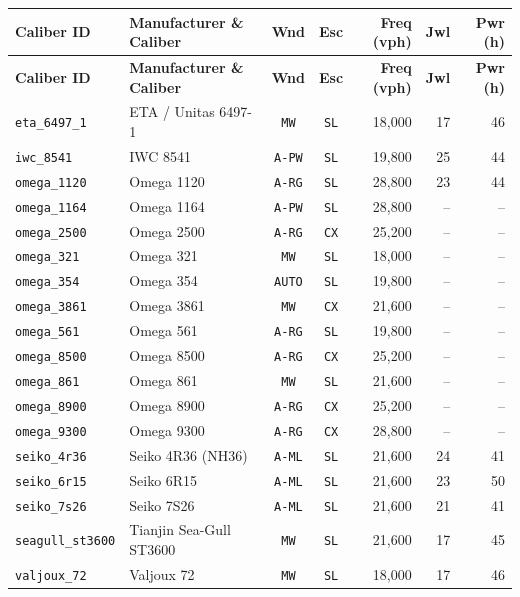 \documentclass[10pt,letterpaper]{article}
\begin{document}
{\small
\setlength{\tabcolsep}{5pt}
\begin{longtable}{@{}l L{4.2cm} c c r r r@{}}
\toprule
\textbf{Caliber ID} & \textbf{Manufacturer \& Caliber} & \textbf{Wnd} & \textbf{Esc} & \textbf{Freq (vph)} & \textbf{Jwl} & \textbf{Pwr (h)} \\
\midrule
\endfirsthead
\toprule
\textbf{Caliber ID} & \textbf{Manufacturer \& Caliber} & \textbf{Wnd} & \textbf{Esc} & \textbf{Freq (vph)} & \textbf{Jwl} & \textbf{Pwr (h)} \\
\midrule
\endhead
\bottomrule
\endfoot
\texttt{eta\_6497\_1} & ETA / Unitas 6497-1 & \texttt{MW} & \texttt{SL} & 18,000 & 17 & 46 \\
\texttt{iwc\_8541} & IWC 8541 & \texttt{A-PW} & \texttt{SL} & 19,800 & 25 & 44 \\
\texttt{omega\_1120} & Omega 1120 & \texttt{A-RG} & \texttt{SL} & 28,800 & 23 & 44 \\
\texttt{omega\_1164} & Omega 1164 & \texttt{A-PW} & \texttt{SL} & 28,800 & -- & -- \\
\texttt{omega\_2500} & Omega 2500 & \texttt{A-RG} & \texttt{CX} & 25,200 & -- & -- \\
\texttt{omega\_321} & Omega 321 & \texttt{MW} & \texttt{SL} & 18,000 & -- & -- \\
\texttt{omega\_354} & Omega 354 & \texttt{AUTO} & \texttt{SL} & 19,800 & -- & -- \\
\texttt{omega\_3861} & Omega 3861 & \texttt{MW} & \texttt{CX} & 21,600 & -- & -- \\
\texttt{omega\_561} & Omega 561 & \texttt{A-RG} & \texttt{SL} & 19,800 & -- & -- \\
\texttt{omega\_8500} & Omega 8500 & \texttt{A-RG} & \texttt{CX} & 25,200 & -- & -- \\
\texttt{omega\_861} & Omega 861 & \texttt{MW} & \texttt{SL} & 21,600 & -- & -- \\
\texttt{omega\_8900} & Omega 8900 & \texttt{A-RG} & \texttt{CX} & 25,200 & -- & -- \\
\texttt{omega\_9300} & Omega 9300 & \texttt{A-RG} & \texttt{CX} & 28,800 & -- & -- \\
\texttt{seiko\_4r36} & Seiko 4R36 (NH36) & \texttt{A-ML} & \texttt{SL} & 21,600 & 24 & 41 \\
\texttt{seiko\_6r15} & Seiko 6R15 & \texttt{A-ML} & \texttt{SL} & 21,600 & 23 & 50 \\
\texttt{seiko\_7s26} & Seiko 7S26 & \texttt{A-ML} & \texttt{SL} & 21,600 & 21 & 41 \\
\texttt{seagull\_st3600} & Tianjin Sea-Gull ST3600 & \texttt{MW} & \texttt{SL} & 21,600 & 17 & 45 \\
\texttt{valjoux\_72} & Valjoux 72 & \texttt{MW} & \texttt{SL} & 18,000 & 17 & 46 \\
\end{longtable}
}
\end{document}
